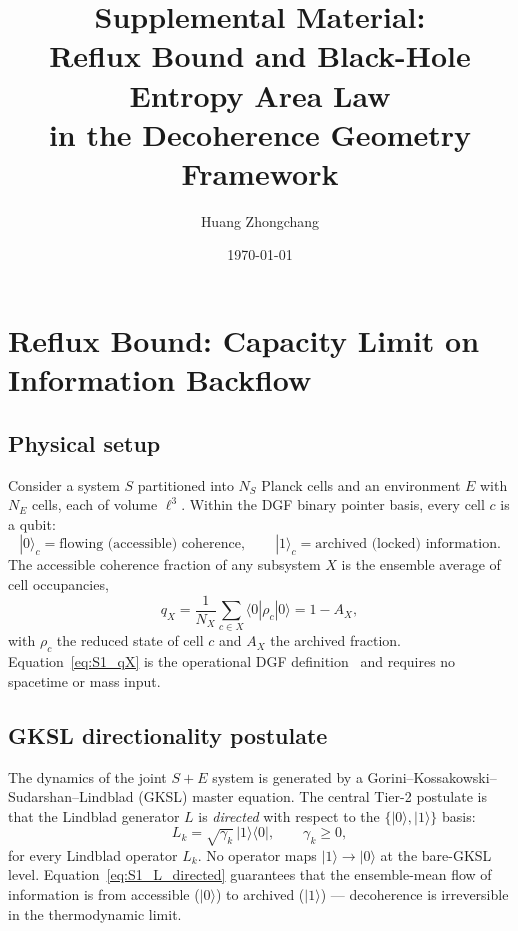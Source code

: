 \documentclass[aps,prd,twocolumn,superscriptaddress,nofootinbib,floatfix]{revtex4-2}
\begin{document}
\title{Supplemental Material: \\
Reflux Bound and Black-Hole Entropy Area Law \\
in the Decoherence Geometry Framework}
\author{Huang Zhongchang}
\date{\today}

\maketitle

\section{Reflux Bound: Capacity Limit on Information Backflow}
\label{sec:S1}

\subsection{Physical setup}

Consider a system $S$ partitioned into $N_S$ Planck cells and an environment
$E$ with $N_E$ cells, each of volume $\ell^3$.  Within the DGF binary pointer
basis, every cell $c$ is a qubit:
\begin{equation}
  |0\rangle_c = \text{flowing (accessible) coherence},\qquad
  |1\rangle_c = \text{archived (locked) information}.
  \label{eq:S1_basis}
\end{equation}
The accessible coherence fraction of any subsystem $X$ is the ensemble average
of cell occupancies,
\begin{equation}
  q_X = \frac{1}{N_X}\sum_{c\in X} \langle 0|\rho_c|0\rangle
      = 1 - A_X,
  \label{eq:S1_qX}
\end{equation}
with $\rho_c$ the reduced state of cell $c$ and $A_X$ the archived fraction.
Equation~\eqref{eq:S1_qX} is the operational DGF definition~\cite{dgf_prd}
and requires no spacetime or mass input.

\subsection{GKSL directionality postulate}

The dynamics of the joint $S+E$ system is generated by a Gorini--Kossakowski--
Sudarshan--Lindblad (GKSL) master equation.  The central Tier-2 postulate is
that the Lindblad generator $L$ is \emph{directed} with respect to the
$\{|0\rangle,|1\rangle\}$ basis:
\begin{equation}
  \boxed{
  L_k = \sqrt{\gamma_k}\,|1\rangle\langle 0|,\qquad \gamma_k \ge 0,
  }
  \label{eq:S1_L_directed}
\end{equation}
for every Lindblad operator $L_k$.  No operator maps $|1\rangle\to|0\rangle$
at the bare-GKSL level.  Equation~\eqref{eq:S1_L_directed} guarantees that the
ensemble-mean flow of information is from accessible ($|0\rangle$) to archived
($|1\rangle$) --- decoherence is irreversible in the thermodynamic limit.
\end{document}
